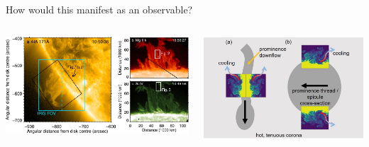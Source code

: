 \documentclass[10pt,aspectratio=169,usenames,dvipsnames]{beamer}
\begin{document}

\begin{frame}{How would this manifest as an observable?}
\begin{columns}
\begin{column}{0.6\textwidth}
\includegraphics[width=0.95\linewidth]{2023Dundee/Figures/khiprominence.jpg}
\end{column}
\begin{column}{0.4\textwidth}
\includegraphics[width=0.95\linewidth]{2023Dundee/Figures/schematic.jpg}
\end{column}
\end{columns}
\end{frame}
\end{document}
